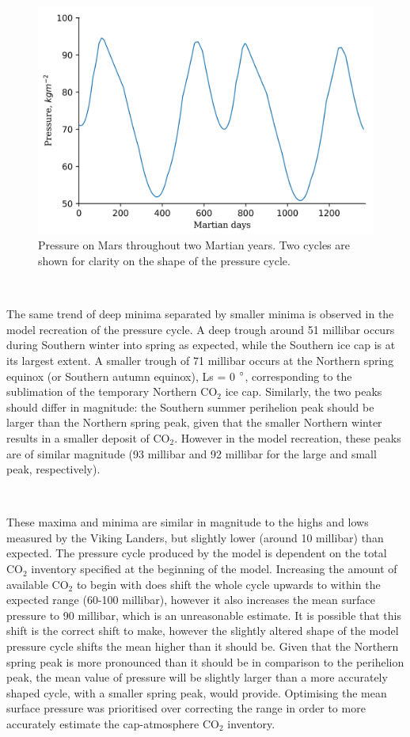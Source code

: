 \documentclass[12pt,onecolumn]{revtex4-2}    %
\begin{document}
\

\begin{figure}[H]
\centering
\includegraphics[width = 14cm]{mars_pressure2.png}
\caption{Pressure on Mars throughout two Martian years. Two cycles are shown for clarity on the shape of the pressure cycle.}
\label{fig:test}
\end{figure}

\

The same trend of deep minima separated by smaller minima is observed in the model recreation of the pressure cycle. A deep trough around 51 millibar occurs during Southern winter into spring as expected, while the Southern ice cap is at its largest extent. A smaller trough of 71 millibar occurs at the Northern spring equinox (or Southern autumn equinox), Ls = 0 $\degree$, corresponding to the sublimation of the temporary Northern $\mathrm{CO_2}$ ice cap. Similarly, the two peaks should differ in magnitude: the Southern summer perihelion peak should be larger than the Northern spring peak, given that the smaller Northern winter results in a smaller deposit of $\mathrm{CO_2}$. However in the model recreation, these peaks are of similar magnitude (93 millibar and 92 millibar for the large and small peak, respectively).

\

These maxima and minima are similar in magnitude to the highs and lows measured by the Viking Landers, but slightly lower (around 10 millibar) than expected. The pressure cycle produced by the model is dependent on the total $\mathrm{CO_2}$ inventory specified at the beginning of the model. Increasing the amount of available $\mathrm{CO_2}$ to begin with does shift the whole cycle upwards to within the expected range (60-100 millibar), however it also increases the mean surface pressure to 90 millibar, which is an unreasonable estimate. It is possible that this shift is the correct shift to make, however the slightly altered shape of the model pressure cycle shifts the mean higher than it should be. Given that the Northern spring peak is more pronounced than it should be in comparison to the perihelion peak, the mean value of pressure will be slightly larger than a more accurately shaped cycle, with a smaller spring peak, would provide. Optimising the mean surface pressure was prioritised over correcting the range in order to more accurately estimate the cap-atmosphere $\mathrm{CO_2}$ inventory.
\end{document}
